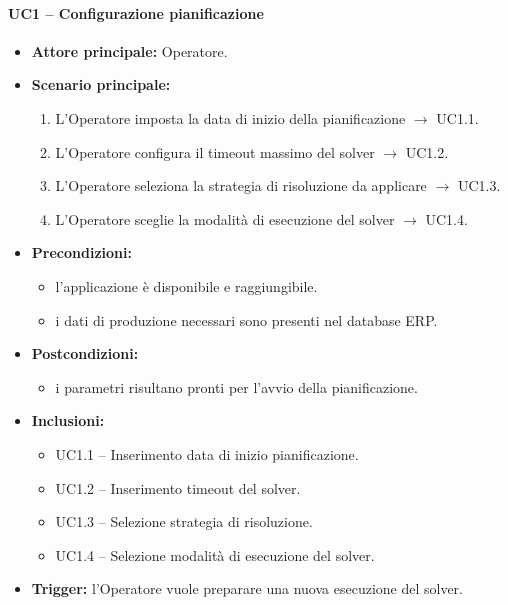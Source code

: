 \paragraph{UC1 -- Configurazione pianificazione}
\begin{itemize}
    \item \textbf{Attore principale:} Operatore.
    \item \textbf{Scenario principale:}
    \begin{enumerate}
        \item L'Operatore imposta la data di inizio della pianificazione $\rightarrow$ UC1.1.
        \item L'Operatore configura il timeout massimo del solver $\rightarrow$ UC1.2.
        \item L'Operatore seleziona la strategia di risoluzione da applicare $\rightarrow$ UC1.3.
        \item L'Operatore sceglie la modalità di esecuzione del solver $\rightarrow$ UC1.4.
    \end{enumerate}
    \item \textbf{Precondizioni:}
    \begin{itemize}
        \item l'applicazione è disponibile e raggiungibile.
        \item i dati di produzione necessari sono presenti nel database ERP.
    \end{itemize}
    \item \textbf{Postcondizioni:}
    \begin{itemize}
        \item i parametri risultano pronti per l'avvio della pianificazione.
    \end{itemize}
    \item \textbf{Inclusioni:}
    \begin{itemize}
        \item UC1.1 -- Inserimento data di inizio pianificazione.
        \item UC1.2 -- Inserimento timeout del solver.
        \item UC1.3 -- Selezione strategia di risoluzione.
        \item UC1.4 -- Selezione modalità di esecuzione del solver.
    \end{itemize}
    \item \textbf{Trigger:} l'Operatore vuole preparare una nuova esecuzione del solver.
\end{itemize}

